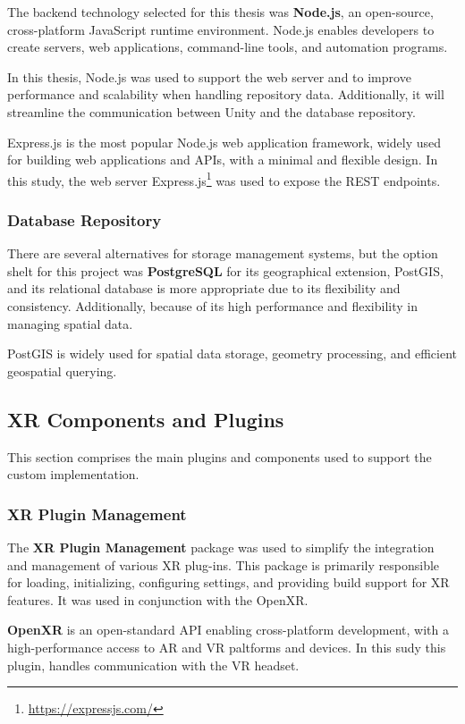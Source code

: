 The backend technology selected for this thesis was \textbf{Node.js}, an open-source, cross-platform JavaScript runtime environment. 
Node.js enables developers to create servers, web applications, command-line tools, and automation programs.

In this thesis, Node.js was used to support the web server and to improve performance and scalability when handling repository data. 
Additionally, it will streamline the communication between Unity and the database repository.

Express.js is the most popular Node.js web application framework, widely used for building web applications and \gls{API}s, with a minimal and flexible design.
In this study, the web server Express.js\footnote{\url{https://expressjs.com/}} was used to expose the REST endpoints.


\subsubsection{Database Repository}
\label{sec:repos}

There are several alternatives for storage management systems, but the option shelt for this project was \textbf{PostgreSQL} for its geographical extension, PostGIS, and its relational database is more appropriate due to its flexibility and consistency.
Additionally, because of its high performance and flexibility in managing spatial data. 

PostGIS is widely used for spatial data storage, geometry processing, and efficient geospatial querying.

\subsection{XR Components and Plugins}
This section comprises the main plugins and components used to support the custom implementation.
\subsubsection{XR Plugin Management}
The \textbf{XR Plugin Management} package was used to simplify the integration and management of various XR plug-ins. 
This package is primarily responsible for loading, initializing, configuring settings, and providing build support for XR features. 
It was used in conjunction with the OpenXR.

\textbf{OpenXR} is an open-standard \gls{API} enabling cross-platform development, with a high-performance access to AR and VR paltforms and devices. In this sudy this plugin, handles communication with the \gls{VR} headset.

